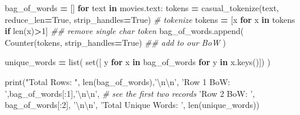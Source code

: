 \documentclass[
]{book}
\newenvironment{Shaded}{\begin{snugshade}}{\end{snugshade}}
\newcommand{\BuiltInTok}[1]{#1}
\newcommand{\CharTok}[1]{\textcolor[rgb]{0.5,0.5,0.5}{#1}}
\newcommand{\CommentTok}[1]{\textcolor[rgb]{0.37,0.37,0.37}{\textit{#1}}}
\newcommand{\ControlFlowTok}[1]{\textcolor[rgb]{0.27,0.27,0.27}{\textbf{#1}}}
\newcommand{\DecValTok}[1]{\textcolor[rgb]{0.06,0.06,0.06}{#1}}
\newcommand{\KeywordTok}[1]{\textcolor[rgb]{0.27,0.27,0.27}{\textbf{#1}}}
\newcommand{\NormalTok}[1]{#1}
\newcommand{\OperatorTok}[1]{\textcolor[rgb]{0.43,0.43,0.43}{\textbf{#1}}}
\newcommand{\StringTok}[1]{\textcolor[rgb]{0.5,0.5,0.5}{#1}}
\newcommand{\VariableTok}[1]{\textcolor[rgb]{0,0,0}{#1}}
\begin{document}
\begin{Shaded}
\begin{Highlighting}[]
\NormalTok{bag_of_words }\OperatorTok{=}\NormalTok{ []}
\ControlFlowTok{for}\NormalTok{ text }\KeywordTok{in}\NormalTok{ movies.text:}
\NormalTok{    tokens }\OperatorTok{=}\NormalTok{ casual_tokenize(text, reduce_len}\OperatorTok{=}\VariableTok{True}\NormalTok{, strip_handles}\OperatorTok{=}\VariableTok{True}\NormalTok{)  }\CommentTok{# tokenize}
\NormalTok{    tokens }\OperatorTok{=}\NormalTok{ [x }\ControlFlowTok{for}\NormalTok{ x }\KeywordTok{in}\NormalTok{ tokens }\ControlFlowTok{if} \BuiltInTok{len}\NormalTok{(x)}\OperatorTok{>}\DecValTok{1}\NormalTok{]                  }\CommentTok{## remove single char token}
\NormalTok{    bag_of_words.append( Counter(tokens, strip_handles}\OperatorTok{=}\VariableTok{True}\NormalTok{)  }\CommentTok{## add to our BoW}
\NormalTok{    )}

\NormalTok{unique_words }\OperatorTok{=}  \BuiltInTok{list}\NormalTok{( }\BuiltInTok{set}\NormalTok{([ y  }\ControlFlowTok{for}\NormalTok{ x }\KeywordTok{in}\NormalTok{ bag_of_words  }\ControlFlowTok{for}\NormalTok{ y }\KeywordTok{in}\NormalTok{ x.keys()]) )}

\BuiltInTok{print}\NormalTok{(}\StringTok{"Total Rows: "}\NormalTok{, }\BuiltInTok{len}\NormalTok{(bag_of_words),}\StringTok{'}\CharTok{\textbackslash{}n\textbackslash{}n}\StringTok{'}\NormalTok{,}
      \StringTok{'Row 1 BoW: '}\NormalTok{,bag_of_words[:}\DecValTok{1}\NormalTok{],}\StringTok{'}\CharTok{\textbackslash{}n\textbackslash{}n}\StringTok{'}\NormalTok{,    }\CommentTok{# see the first two records}
      \StringTok{'Row 2 BoW: '}\NormalTok{, bag_of_words[:}\DecValTok{2}\NormalTok{], }\StringTok{'}\CharTok{\textbackslash{}n\textbackslash{}n}\StringTok{'}\NormalTok{,}
      \StringTok{'Total Unique Words: '}\NormalTok{, }\BuiltInTok{len}\NormalTok{(unique_words))}
\end{Highlighting}
\end{Shaded}
\end{document}
